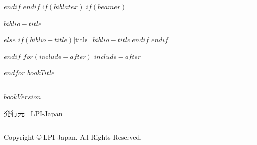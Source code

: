 \documentclass[
$if(fontsize)$
  $fontsize$,
$endif$
$if(papersize)$
  $papersize$paper,
$endif$
$if(beamer)$
  ignorenonframetext,
$if(handout)$
  handout,
$endif$
$if(aspectratio)$
  aspectratio=$aspectratio$,
$endif$
$endif$
$for(classoption)$
  $classoption$$sep$,
$endfor$
]{$documentclass$}
\newif\ifbibliography
\begin{document}
$endif$
$endif$
$if(biblatex)$
$if(beamer)$
\begin{frame}[allowframebreaks]{$biblio-title$}
  \bibliographytrue
  \printbibliography[heading=none]
\end{frame}
$else$
\printbibliography$if(biblio-title)$[title=$biblio-title$]$endif$
$endif$

$endif$
$for(include-after)$
$include-after$

$endfor$
\newpage
\thispagestyle{empty}
  \vspace*{\fill}
  {\LARGE $bookTitle$}

  \rule{\textwidth}{0.5pt}

  $bookVersion$

  発行元 \, LPI-Japan

  \rule{\textwidth}{0.5pt}

  Copyright \copyright{} LPI-Japan. All Rights Reserved.

  \vspace*{1cm}
\end{document}
